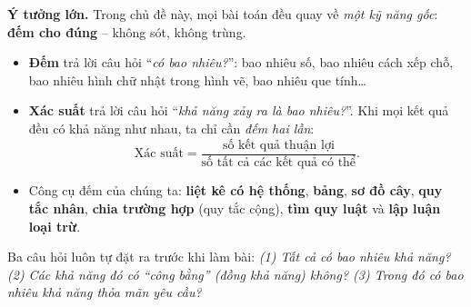 \documentclass[11pt]{article}
\begin{document}
\providecommand{\cpSpinSix}[6]{%
  \foreach \a in {90,150,210,270,330,30}{\draw[Ink,line width=0.8pt] (0,0)--(\a:1.1);}
  \draw[Ink,line width=1pt] (0,0) circle (1.1);
  \node[font=\itshape\large] at (120:0.72){#1};
  \node[font=\itshape\large] at (60:0.72){#2};
  \node[font=\itshape\large] at (0:0.72){#3};
  \node[font=\itshape\large] at (-60:0.72){#4};
  \node[font=\itshape\large] at (-120:0.72){#5};
  \node[font=\itshape\large] at (180:0.72){#6};
  \draw[-{Stealth[length=7pt]},line width=1.6pt,Ink] (0,0)--(250:0.98);
  \fill[Ink] (0,0) circle (1.6pt);}
\providecommand{\cpOct}[2]{%
  \draw[Ink,line width=0.8pt,fill=tmBlue!8] (#1-0.2071,#2+0.5)--(#1+0.2071,#2+0.5)--(#1+0.5,#2+0.2071)--(#1+0.5,#2-0.2071)
     --(#1+0.2071,#2-0.5)--(#1-0.2071,#2-0.5)--(#1-0.5,#2-0.2071)--(#1-0.5,#2+0.2071)--cycle;}
\providecommand{\cpDia}[2]{%
  \draw[Ink,line width=0.8pt,fill=tmOrange!35] (#1,#2+0.2929)--(#1+0.2929,#2)--(#1,#2-0.2929)--(#1-0.2929,#2)--cycle;}
\providecommand{\rvcaBall}[3]{\filldraw[fill=#3!55,draw=#3!75!black,line width=0.7pt] (#1,#2) circle (0.22);}

\begin{knowbox}
\textbf{Ý tưởng lớn.} Trong chủ đề này, mọi bài toán đều quay về \emph{một kỹ năng gốc}: \textbf{đếm cho đúng} -- không sót, không trùng.
\begin{itemize}[leftmargin=1.2em,itemsep=1pt,topsep=2pt]
\item \textbf{Đếm} trả lời câu hỏi ``\emph{có bao nhiêu?}'': bao nhiêu số, bao nhiêu cách xếp chỗ, bao nhiêu hình chữ nhật trong hình vẽ, bao nhiêu que tính\ldots
\item \textbf{Xác suất} trả lời câu hỏi ``\emph{khả năng xảy ra là bao nhiêu?}''. Khi mọi kết quả đều có khả năng như nhau, ta chỉ cần \emph{đếm hai lần}:
\[
\text{Xác suất}=\frac{\text{số kết quả thuận lợi}}{\text{số tất cả các kết quả có thể}} .
\]
\item Công cụ đếm của chúng ta: \textbf{liệt kê có hệ thống}, \textbf{bảng}, \textbf{sơ đồ cây}, \textbf{quy tắc nhân}, \textbf{chia trường hợp} (quy tắc cộng), \textbf{tìm quy luật} và \textbf{lập luận loại trừ}.
\end{itemize}
Ba câu hỏi luôn tự đặt ra trước khi làm bài: \emph{(1) Tất cả có bao nhiêu khả năng? (2) Các khả năng đó có ``công bằng'' (đồng khả năng) không? (3) Trong đó có bao nhiêu khả năng thỏa mãn yêu cầu?}
\end{knowbox}
\end{document}
